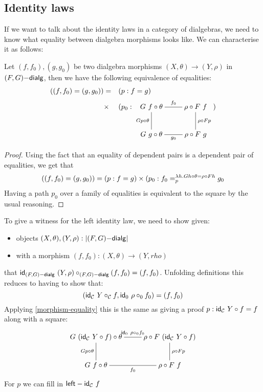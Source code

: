 \subsection{Identity laws}

If we want to talk about the identity laws in a category of
dialgebras, we need to know what equality between dialgebra morphisms
looks like. We can characterise it as follows:

\begin{proposition}
  \label{morphism-equality}
  Let $(f,f_0),(g,g_0)$ be two dialgebra morphisms
  $(X,\theta) \to (Y,\rho)$ in $\dialgcat{F}{G}$, then we have the
  following equivalence of equalities:
  \begin{align*}
    ((f,f_0) = (g,g_0)) &= &&(p : f = g)\\
    &\times &&(p_0 : 
              \xymatrix{
              G\ f \circ \theta
              \ar@{-}[r]^{f_0}
              \ar@{-}[d]_{G p \circ \theta}
              &\rho \circ F\ f
              \ar@{-}[d]^{\rho \circ F p}
              \\
              G\ g \circ \theta
              \ar@{-}[r]_{g_0}
              &\rho \circ F\ g
              })
  \end{align*}
\end{proposition}

\begin{proof}
  Using the fact that an equality of dependent pairs is a dependent pair of equalities, we get that
  $$
  ((f,f_0) = (g,g_0)) = (p : f = g) \times (p_0 : \pathover{\lambda h . G h \circ \theta = \rho \circ F h}{p}{f_0}{g_0}
  $$
  Having a path $p_0$ over a family of equalities is equivalent to the
  square by the usual reasoning.
\end{proof}

To give a witness for the left identity law, we need to show given:
\begin{itemize}
\item objects $(X,\theta), (Y,\rho) : |\dialgcat{F}{G}|$
\item with a morphism $(f,f_0) : (X,\theta) \to (Y,rho)$
\end{itemize}
that $\id_{\dialgcat{F}{G}}\ (Y,\rho) \circ_{\dialgcat{F}{G}} (f,f_0) = (f,f_0)$. Unfolding definitions this reduces to having to show that:
$$
(\id_{\Cc}\ Y \circ_{\Cc} f , \id_0\ \rho \circ_0 f_0) = (f,f_0)
$$
Applying \cref{morphism-equality} this is the same as giving a proof $p : \id_{\Cc}\ Y \circ f = f$ along with a square:
$$
\xymatrix{
              G\ (\id_{\Cc}\ Y \circ f) \circ \theta
              \ar@{-}[r]^{\id_0\ \rho \circ_0 f_0}
              \ar@{-}[d]_{G p \circ \theta}
              &\rho \circ F\ (\id_{\Cc}\ Y \circ f)
              \ar@{-}[d]^{\rho \circ F p}
              \\
              G\ f \circ \theta
              \ar@{-}[r]_{f_0}
              &\rho \circ F\ f
              }
$$
For $p$ we can fill in $\leftid_{\Cc}\ f$


